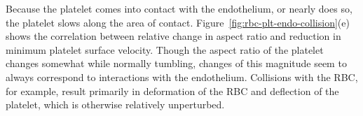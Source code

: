 Because the platelet comes into contact with the endothelium, or nearly does so, the
platelet slows along the area of contact. Figure~\ref{fig:rbc-plt-endo-collision}(e)
shows the correlation between relative change in aspect ratio and reduction in minimum
platelet surface velocity. Though the aspect ratio of the platelet changes somewhat while
normally tumbling, changes of this magnitude seem to always correspond to interactions
with the endothelium. Collisions with the RBC, for example, result primarily in
deformation of the RBC and deflection of the platelet, which is otherwise relatively
unperturbed.
